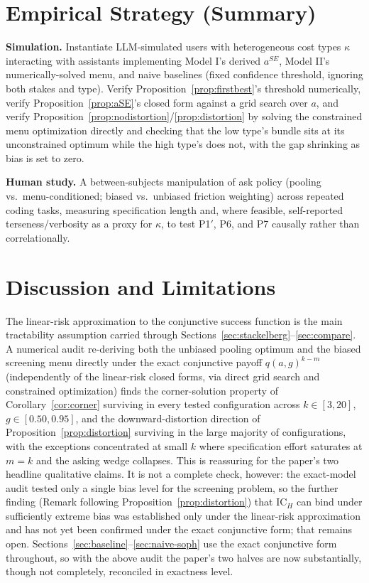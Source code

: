 \documentclass[11pt]{article}
\begin{document}
\section{Empirical Strategy (Summary)}

\textbf{Simulation.} Instantiate LLM-simulated users with heterogeneous cost
types $\kappa$ interacting with assistants implementing Model I's derived
$a^{SE}$, Model II's numerically-solved menu, and naive baselines (fixed
confidence threshold, ignoring both stakes and type). Verify
Proposition~\ref{prop:firstbest}'s threshold numerically, verify
Proposition~\ref{prop:aSE}'s closed form against a grid search over $a$, and
verify Proposition~\ref{prop:nodistortion}/\ref{prop:distortion} by solving the
constrained menu optimization directly and checking that the low type's bundle
sits at its unconstrained optimum while the high type's does not, with the gap
shrinking as bias is set to zero.

\textbf{Human study.} A between-subjects manipulation of ask policy (pooling vs.\
menu-conditioned; biased vs.\ unbiased friction weighting) across repeated coding
tasks, measuring specification length and, where feasible, self-reported
terseness/verbosity as a proxy for $\kappa$, to test P1$'$, P6, and P7 causally
rather than correlationally.

\section{Discussion and Limitations}
\label{sec:discussion}

The linear-risk approximation to the conjunctive success function is the main
tractability assumption carried through Sections~\ref{sec:stackelberg}--\ref{sec:compare}.
A numerical audit re-deriving both the unbiased pooling optimum and the biased
screening menu directly under the exact conjunctive payoff $q(a,g)^{k-m}$
(independently of the linear-risk closed forms, via direct grid search and
constrained optimization) finds the corner-solution property of
Corollary~\ref{cor:corner} surviving in every tested configuration across
$k\in[3,20]$, $g\in[0.50,0.95]$, and the downward-distortion direction of
Proposition~\ref{prop:distortion} surviving in the large majority of
configurations, with the exceptions concentrated at small $k$ where specification
effort saturates at $m=k$ and the asking wedge collapses. This is reassuring for
the paper's two headline qualitative claims. It is not a complete check, however:
the exact-model audit tested only a single bias level for the screening problem,
so the further finding (Remark following Proposition~\ref{prop:distortion}) that
$\text{IC}_H$ can bind under sufficiently extreme bias was established only under
the linear-risk approximation and has not yet been confirmed under the exact
conjunctive form; that remains open. Sections~\ref{sec:baseline}--\ref{sec:naive-soph}
use the exact conjunctive form throughout, so with the above audit the paper's
two halves are now substantially, though not completely, reconciled in exactness
level.
\end{document}
